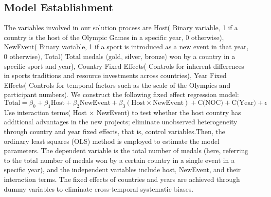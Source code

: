 \documentclass{mcmthesis}  %
\begin{document}
\subsection{Model Establishment}  %
\hspace*{1.5em}The variables involved in our solution process are Host( Binary variable, 1 if a country is the host of the Olympic Games in a specific year, 0 otherwise), NewEvent( Binary variable, 1 if a sport is introduced as a new event in that year, 0 otherwise), Total( Total medals (gold, silver, bronze) won by a country in a specific sport and year), Country Fixed Effects( Controls for inherent differences in sports traditions and resource investments across countries), Year Fixed Effects( Controls for temporal factors such as the scale of the Olympics and participant numbers). We construct the following fixed effect regression model: \[
\text{Total} = \beta_0 + \beta_1 \text{Host} + \beta_2 \text{NewEvent} + \beta_3 (\text{Host} \times \text{NewEvent}) + \text{C(NOC)} + \text{C(Year)} + \epsilon\]
\hspace*{1.5em}Use interaction terms( Host × NewEvent) to test whether the host country has additional advantages in the new projects; eliminate unobserved heterogeneity through country and year fixed effects, that is, control variables.Then, the ordinary least squares (OLS) method is employed to estimate the model parameters. The dependent variable is the total number of medals (here, referring to the total number of medals won by a certain country in a single event in a specific year), and the independent variables include host, NewEvent, and their interaction terms. The fixed effects of countries and years are achieved through dummy variables to eliminate cross-temporal systematic biases.
\end{document}
